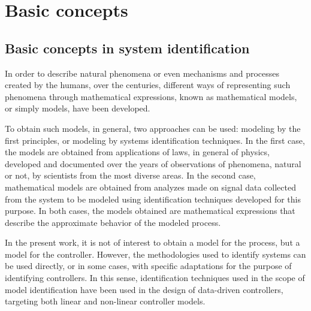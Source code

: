 
\chapter{Basic concepts}
\label{cap:cap2} \vspace{-1cm}

\section{Basic concepts in system identification}%
\label{sec:bas_ident}


%
In order to describe natural phenomena or even mechanisms and processes created by the humans, over the centuries, different ways of representing such phenomena through mathematical expressions, known as mathematical models, or simply models, have been developed.

To obtain such models, in general, two approaches can be used: modeling by the first principles, or modeling by systems identification techniques. In the first case, the models are obtained from applications of laws, in general of physics, developed and documented over the years of observations of phenomena, natural or not, by scientists from the most diverse areas. In the second case, mathematical models are obtained from analyzes made on signal data collected from the system to be modeled using identification techniques developed for this purpose. In both cases, the models obtained are mathematical expressions that describe the approximate behavior of the modeled process.

In the present work, it is not of interest to obtain a model for the process, but a model for the controller. However, the methodologies used to identify systems can be used directly, or in some cases, with specific adaptations for the purpose of identifying controllers. In this sense, identification techniques used in the scope of model identification have been used in the design of data-driven controllers, targeting both linear \citep{campi2002} and non-linear \citep{campi2006} controller models.

